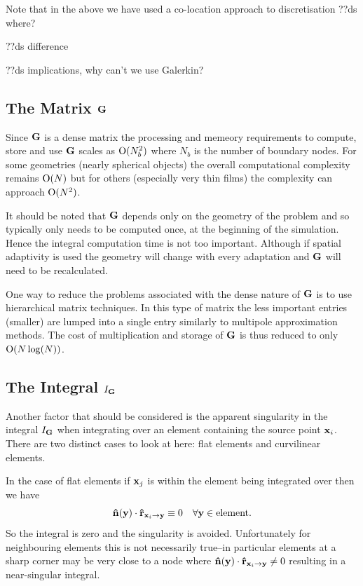 Note that in the above we have used a co-location approach to discretisation
??ds where?

??ds difference

??ds implications, why can't we use Galerkin?

\subsection{The Matrix ${\mathbf{G}}$}
Since ${\mathbf{G}}$ is a dense matrix the processing and memeory requirements to compute, store and use ${\mathbf{G}}$ scales as $\text{O}(N_b^2)$ where $N_b$ is the number of boundary nodes. For some geometries (\eg nearly spherical objects) the overall computational complexity remains $\text{O}(N)$ but for others (especially very thin films) the complexity can approach $\text{O}(N^2)$.

It should be noted that ${\mathbf{G}}$ depends only on the geometry of the problem and so typically only needs to be computed once, at the beginning of the simulation. Hence the integral computation time is not too important. Although if spatial adaptivity is used the geometry will change with every adaptation and ${\mathbf{G}}$ will need to be recalculated.

One way to reduce the problems associated with the dense nature of ${\mathbf{G}}$ is to use hierarchical matrix techniques. In this type of matrix the less important entries (\ie smaller) are lumped into a single entry similarly to multipole approximation methods. The cost of multiplication and storage of ${\mathbf{G}}$ is thus reduced to only $\text{O}(N \log(N))$.\cite{Knittel2009}

\subsection{The Integral $I_{\mathbf{G}}$}
Another factor that should be considered is the apparent singularity in the integral $I_{\mathbf{G}}$ when integrating over an element containing the source point $\mathbf{x}_{i}$. There are two distinct cases to look at here: flat elements and curvilinear elements.

In the case of flat elements if $\mathbf{x}_{j}$ is within the element being integrated over then we have
\begin{equation}
  \label{eq:7}
  \mathbf{\hat{n}}(\mathbf{y}) \cdot \mathbf{\hat{r}}_{\mathbf{x}_{{i}} \rightarrow \mathbf{y}} \equiv 0 \quad \forall \mathbf{y} \in \text{element}.
\end{equation}
So the integral is zero and the singularity is avoided. Unfortunately for neighbouring elements this is not necessarily true--in particular elements at a sharp corner may be very close to a node where $\mathbf{\hat{n}}(\mathbf{y}) \cdot \mathbf{\hat{r}}_{\mathbf{x}_{{i}} \rightarrow \mathbf{y}} \neq 0$ resulting in a near-singular integral.


